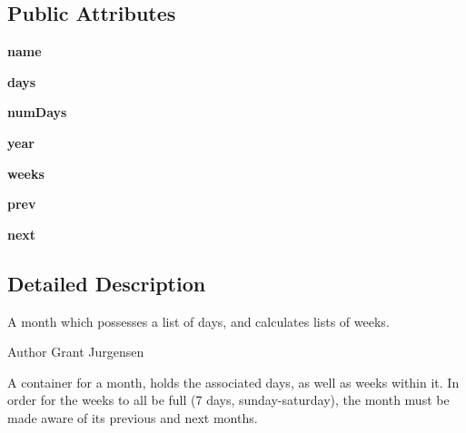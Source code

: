 \subsection*{Public Attributes}
\begin{DoxyCompactItemize}
\item 
{\bfseries name}\hypertarget{classapp_1_1Month_1_1Month_ad8bb2df501f5c1371b5315c2f6e3035f}{}\label{classapp_1_1Month_1_1Month_ad8bb2df501f5c1371b5315c2f6e3035f}

\item 
{\bfseries days}\hypertarget{classapp_1_1Month_1_1Month_ae9e6419b902f69c5a08866a2d598dfca}{}\label{classapp_1_1Month_1_1Month_ae9e6419b902f69c5a08866a2d598dfca}

\item 
{\bfseries num\+Days}\hypertarget{classapp_1_1Month_1_1Month_ae05ee940bd515dbf90455ab77221a785}{}\label{classapp_1_1Month_1_1Month_ae05ee940bd515dbf90455ab77221a785}

\item 
{\bfseries year}\hypertarget{classapp_1_1Month_1_1Month_a6b1efc7cf987876f70dda6540dd5ff7b}{}\label{classapp_1_1Month_1_1Month_a6b1efc7cf987876f70dda6540dd5ff7b}

\item 
{\bfseries weeks}\hypertarget{classapp_1_1Month_1_1Month_aa7666a88a2282ba3172d2fdc3f26c301}{}\label{classapp_1_1Month_1_1Month_aa7666a88a2282ba3172d2fdc3f26c301}

\item 
{\bfseries prev}\hypertarget{classapp_1_1Month_1_1Month_a53b0c7e0822baa2ec552d7fbd52625c1}{}\label{classapp_1_1Month_1_1Month_a53b0c7e0822baa2ec552d7fbd52625c1}

\item 
{\bfseries next}\hypertarget{classapp_1_1Month_1_1Month_ada35442c38ecaadf5a299f6295ead36e}{}\label{classapp_1_1Month_1_1Month_ada35442c38ecaadf5a299f6295ead36e}

\end{DoxyCompactItemize}


\subsection{Detailed Description}
A month which possesses a list of days, and calculates lists of weeks. 

\begin{DoxyAuthor}{Author}
Grant Jurgensen
\end{DoxyAuthor}
A container for a month, holds the associated days, as well as weeks within it. In order for the weeks to all be full (7 days, sunday-\/saturday), the month must be made aware of its previous and next months. 

